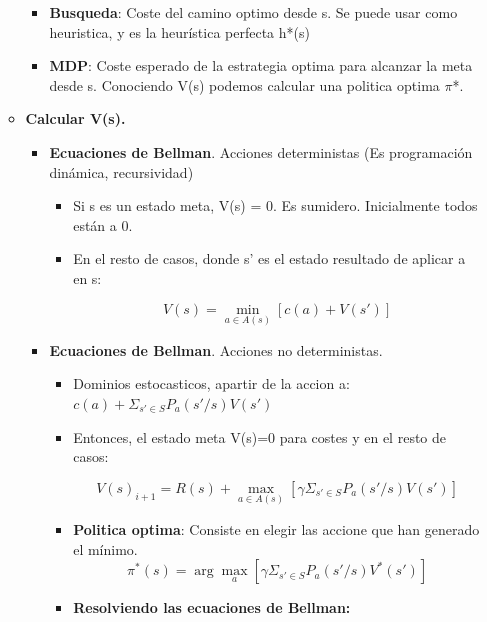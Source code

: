 \documentclass[12pt, twoside, openright]{report} %
\begin{document}
\begin{itemize}
\begin{itemize}
\begin{itemize}
      \item \textbf{Busqueda}: Coste del camino optimo desde s. Se puede
        usar como heuristica, y es la heurística perfecta h*(s)
        
      \item \textbf{MDP}: Coste esperado de la estrategia optima para
        alcanzar la meta desde s. Conociendo V(s) podemos calcular una
        politica optima $\pi$*.
        
      \end{itemize}
    \item \textbf{Calcular V(s).}
      

      \begin{itemize}
      \item \textbf{Ecuaciones de Bellman}. Acciones deterministas (Es
        programación dinámica, recursividad)
        

        \begin{itemize}
        \item Si s es un estado meta, V(s) = 0. Es sumidero. Inicialmente
          todos están a 0.
          
        \item En el resto de casos, donde s' es el estado resultado de
          aplicar a en s:
          
		  $$V(s) = \min_{a\in A(s)} [c(a)+V(s')]$$

        \end{itemize}
      \item \textbf{Ecuaciones de Bellman}. Acciones no deterministas.
        

        \begin{itemize}
        \item Dominios estocasticos, apartir de la accion a: $c(a) + \Sigma_{s'\in S} P_a (s'/s)V(s')$
          
        \item Entonces, el estado meta V(s)=0 para costes y en el resto de
          casos:

		  $$V(s)_{i+1}= R(s)+ \max_{a\in A(s)} [\gamma \Sigma_{s'\in S} P_a(s'/s) V(s')]$$
          
        \item \textbf{Politica optima}: Consiste en elegir las accione que
          han generado el mínimo.
          $$\pi^*(s)= \arg \max_{a} [\gamma \Sigma_{s'\in S} P_a(s'/s) V^*(s')]$$

		  \pagebreak
        \item \textbf{Resolviendo las ecuaciones de Bellman:}
          


\end{itemize}
\end{itemize}
\end{itemize}
\end{itemize}
\end{document}
